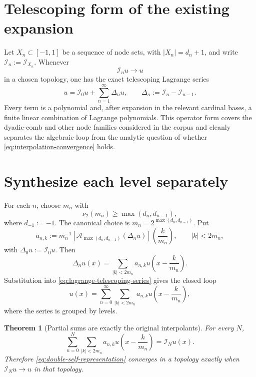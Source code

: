 \documentclass[11pt,oneside]{book}
\newtheorem{theorem}{Theorem}[chapter]
\theoremstyle{definition}
\theoremstyle{remark}
\newcommand{\Iop}{\mathcal I}
\newcommand{\Aop}{\mathcal A}
\newcommand{\vtwo}{\nu_2}
\begin{document}
\section{Telescoping form of the existing expansion}
Let \(X_n\subset[-1,1]\) be a sequence of node sets, with \(|X_n|=d_n+1\), and write \(\Iop_n:=\Iop_{X_n}\).  Whenever
\begin{equation}
 \Iop_nu\longrightarrow u
 \label{eq:interpolation-convergence}
\end{equation}
in a chosen topology, one has the exact telescoping Lagrange series
\begin{equation}
 u=\Iop_0u+\sum_{n=1}^{\infty}\Delta_nu,
 \qquad
 \Delta_n:=\Iop_n-\Iop_{n-1}.
 \label{eq:lagrange-telescoping-series}
\end{equation}
Every term is a polynomial and, after expansion in the relevant cardinal bases, a finite linear combination of Lagrange polynomials.  This operator form covers the dyadic-comb and other node families considered in the corpus and cleanly separates the algebraic loop from the analytic question of whether \cref{eq:interpolation-convergence} holds.

\section{Synthesize each level separately}
For each \(n\), choose \(m_n\) with
\begin{equation}
 \vtwo(m_n)\ge \max(d_n,d_{n-1}),
 \label{eq:mn-condition}
\end{equation}
where \(d_{-1}:=-1\).  The canonical choice is
\(m_n=2^{\max(d_n,d_{n-1})}\).  Put
\begin{equation}
 a_{n,k}:=m_n^{-1}
 \left[\Aop_{\max(d_n,d_{n-1})}(\Delta_nu)\right]
 \left(\frac{k}{m_n}\right),
 \qquad |k|<2m_n,
 \label{eq:level-coefficients}
\end{equation}
with \(\Delta_0u:=\Iop_0u\).  Then
\begin{equation}
 \Delta_nu(x)=\sum_{|k|<2m_n}a_{n,k}
 u\!\left(x-\frac{k}{m_n}\right).
 \label{eq:level-synthesis}
\end{equation}
Substitution into \cref{eq:lagrange-telescoping-series} gives the closed loop
\begin{equation}
 \boxed{
 u(x)=\sum_{n=0}^{\infty}\sum_{|k|<2m_n}
 a_{n,k}u\!\left(x-\frac{k}{m_n}\right),}
 \label{eq:double-self-representation}
\end{equation}
where the series is grouped by levels.

\begin{theorem}[Partial sums are exactly the original interpolants]
\label{thm:partial-sums}
For every \(N\),
\begin{equation}
 \sum_{n=0}^{N}\sum_{|k|<2m_n}
 a_{n,k}u\!\left(x-\frac{k}{m_n}\right)
 =\Iop_Nu(x).
 \label{eq:partial-sum-equals-interpolant}
\end{equation}
Therefore \cref{eq:double-self-representation} converges in a topology exactly when \(\Iop_Nu\to u\) in that topology.
\end{theorem}
\end{document}

